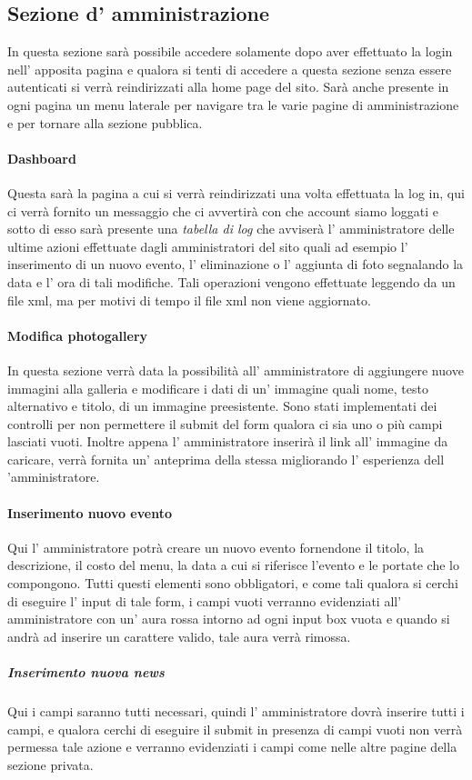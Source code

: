 \subsection{Sezione d' amministrazione}
In questa sezione sarà possibile accedere solamente dopo aver effettuato la login nell' apposita pagina e qualora si tenti di accedere a questa sezione senza essere autenticati si verrà reindirizzati alla home page del sito. Sarà anche presente in ogni pagina un menu laterale per navigare tra le varie pagine di amministrazione e per tornare alla sezione pubblica.
\paragraph{Dashboard}
Questa sarà la pagina a cui si verrà reindirizzati una volta effettuata la log in, qui ci verrà fornito un messaggio che ci avvertirà con che account siamo loggati e sotto di esso sarà presente una \emph{tabella di log} che avviserà l' amministratore delle ultime azioni effettuate dagli amministratori del sito quali ad esempio l' inserimento di un nuovo evento, l' eliminazione o l' aggiunta di foto segnalando la data e l' ora di tali modifiche. Tali operazioni vengono effettuate leggendo da un file xml, ma per motivi di tempo il file xml non viene aggiornato.
\paragraph{Modifica photogallery}
In questa sezione verrà data la possibilità all' amministratore di aggiungere nuove immagini alla galleria e modificare i dati di un' immagine quali nome, testo alternativo e titolo, di un immagine preesistente. Sono stati implementati dei controlli per non permettere il submit del form qualora ci sia uno o più campi lasciati vuoti. Inoltre appena l' amministratore inserirà il link all' immagine da caricare, verrà fornita un' anteprima della stessa migliorando l' esperienza dell 'amministratore.
\paragraph{Inserimento nuovo evento}
Qui l' amministratore potrà creare un nuovo evento fornendone il titolo, la descrizione, il costo del menu, la data a cui si riferisce l'evento e le portate che lo compongono. Tutti questi elementi sono obbligatori, e come tali qualora si cerchi di eseguire l' input di tale form, i campi vuoti verranno evidenziati all' amministratore con un' aura rossa intorno ad ogni input box vuota e quando si andrà ad inserire un carattere valido, tale aura verrà rimossa.
\subparagraph{Inserimento nuova news}
Qui i campi saranno tutti necessari, quindi l' amministratore dovrà inserire tutti i campi, e qualora cerchi di eseguire il submit in presenza di campi vuoti non verrà permessa tale azione e verranno evidenziati i campi come nelle altre pagine della sezione privata.

